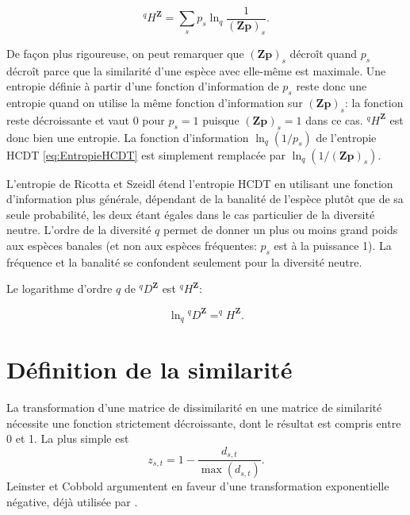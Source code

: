 \documentclass[
  11pt,
  french,
  a4paper,
  extrafontsizes,onecolumn,openright
  ]{memoir}
\begin{document}
\begin{equation}
  \label{eq:Ricotta2006bHZ}
  ^q\!H^{\mathbf{Z}} = \sum_s{p_{s}\ln_q{\frac{1}{\left(\mathbf{Zp}\right)_s}}}.
\end{equation}

De façon plus rigoureuse, on peut remarquer que \({(\mathbf{Zp})}_s\) décroît quand \(p_s\) décroît parce que la similarité d'une espèce avec elle-même est maximale.
Une entropie définie à partir d'une fonction d'information de \(p_s\) reste donc une entropie quand on utilise la même fonction d'information sur \({(\mathbf{Zp})}_s\): la fonction reste décroissante et vaut 0 pour \(p_s=1\) puisque \({(\mathbf{Zp})}_s=1\) dans ce cas.
\(^q\!H^{\mathbf{Z}}\) est donc bien une entropie.
La fonction d'information \(\ln_q(1/p_s)\) de l'entropie HCDT \eqref{eq:EntropieHCDT} est simplement remplacée par \(\ln_q(1/{(\mathbf{Zp})}_s)\).

L'entropie de Ricotta et Szeidl étend l'entropie HCDT en utilisant une fonction d'information plus générale, dépendant de la banalité de l'espèce plutôt que de sa seule probabilité, les deux étant égales dans le cas particulier de la diversité neutre.
L'ordre de la diversité \(q\) permet de donner un plus ou moins grand poids aux espèces banales (et non aux espèces fréquentes: \(p_s\) est à la puissance 1).
La fréquence et la banalité se confondent seulement pour la diversité neutre.

Le logarithme d'ordre \(q\) de \(^q\!D^{\mathbf{Z}}\) est \(^q\!H^{\mathbf{Z}}\):

\begin{equation}
  \label{eq:DqZHqZ}
  \ln_q{^q\!D^{\mathbf{Z}}} = ^q\!H^{\mathbf{Z}}.
\end{equation}

\hypertarget{duxe9finition-de-la-similarituxe9}{%
\section{Définition de la similarité}\label{duxe9finition-de-la-similarituxe9}}

La transformation d'une matrice de dissimilarité en une matrice de similarité nécessite une fonction strictement décroissante, dont le résultat est compris entre 0 et 1.
La plus simple est
\[z_{s,t} = 1 - \frac{d_{s,t}}{\max{(d_{s,t})}}.\]
Leinster et Cobbold argumentent en faveur d'une transformation exponentielle négative, déjà utilisée par \textcite{Nei1972}.



\scriptsize
\end{document}
